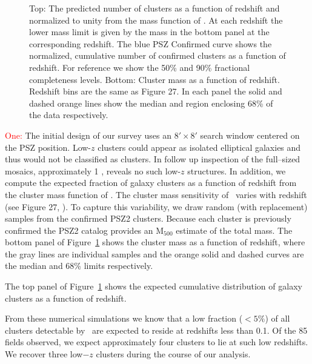 \documentclass[apj, revtex4-1]{emulateapj}
\newcommand{\editorial}[1]{\textcolor{red}{#1}}
\begin{document}
\begin{figure}
	\caption{Top: The predicted number of clusters as a function of redshift and normalized to unity from the mass function of \cite{Tinker2008}. At each redshift the lower mass limit is given by the mass in the bottom panel at the corresponding redshift. The blue PSZ Confirmed curve shows the normalized, cumulative number of confirmed clusters as a function of redshift. For reference we show the 50\% and 90\% fractional completeness levels.
	Bottom: Cluster mass as a function of redshift. Redshift bins are the same as \cite{PlanckCollaboration2016} Figure 27.
	In each panel the solid and dashed orange lines show the median and region enclosing 68\% of the data respectively.}
	\label{fig:cluster_forecast}
\end{figure}

\editorial{One:} The initial design of our survey uses an $8'\times8'$ search window centered on the PSZ position. Low-$z$ clusters could appear as isolated elliptical galaxies and thus would not be classified as clusters. In follow up inspection of the full--sized mosaics, approximately 1 \degsq, reveals no such low-$z$ structures. In addition, we compute the expected fraction of galaxy clusters as a function of redshift from the cluster mass function of \cite{Tinker2008}. The cluster mass sensitivity of \planck\ varies with redshift (see Figure 27, \citealt{PlanckCollaboration2016}). To capture this variability, we draw random (with replacement) samples from the confirmed PSZ2 clusters. Because each cluster is previously confirmed the PSZ2 catalog provides an M$_{500}$ estimate of the total mass. The bottom panel of Figure~\ref{fig:cluster_forecast} shows the cluster mass as a function of redshift, where the gray lines are individual samples and the orange solid and dashed curves are the median and 68\% limits respectively.

The top panel of Figure~\ref{fig:cluster_forecast} shows the expected cumulative distribution of galaxy clusters as a function of redshift.

 From these numerical simulations we know that a low fraction ($<5\%$) of all clusters detectable by \planck\ are expected to reside at redshifts less than 0.1. Of the 85 fields observed, we expect approximately four clusters to lie at such low redshifts. We recover three low$-z$ clusters during the course of our analysis.
\end{document}

